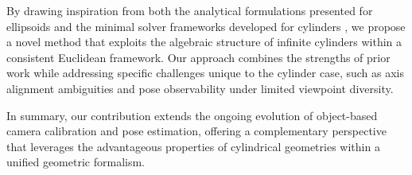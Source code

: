 By drawing inspiration from both the analytical formulations presented for ellipsoids \cite{Gaudilliere2023} and the minimal solver frameworks developed for cylinders \cite{gummeson22pose}, we propose a novel method that exploits the algebraic structure of infinite cylinders within a consistent Euclidean framework. Our approach combines the strengths of prior work while addressing specific challenges unique to the cylinder case, such as axis alignment ambiguities and pose observability under limited viewpoint diversity.

In summary, our contribution extends the ongoing evolution of object-based camera calibration and pose estimation, offering a complementary perspective that leverages the advantageous properties of cylindrical geometries within a unified geometric formalism.


